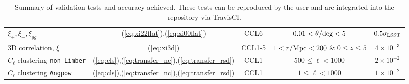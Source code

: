 \begin{sidewaystable*}[!htp]
\begin{tabular}{ l|c c c c}
    $\xi_+,\xi_-,\xi_{gg}$ & (\ref{eq:xi22flat}),(\ref{eq:xi00flat}) & CCL6 & $0.01< \theta/{\rm deg}< 5$&  $0.5\sigma_{\rm LSST}$\\
    3D correlation, $\xi$ & (\ref{eq:xi3d}) & CCL1-5 & $1<r/{\rm Mpc}<200$ \& $0 \leq z \leq 5$& $4\times 10^{-3}$  \\
    $C_\ell$ clustering {\tt non-Limber} &  (\ref{eq:cls}),(\ref{eq:transfer_nc}),(\ref{eq:transfer_rsd}) & CCL1 & $500 \leq \ell < 1000$ & $2\times 10^{-2}$ \\
    $C_\ell$ clustering {\tt Angpow} & (\ref{eq:cls}),(\ref{eq:transfer_nc}),(\ref{eq:transfer_rsd}) & CCL1 & $1 \leq \ell < 1000$ & $1\times 10^{-2}$  \\
    \hline
  \end{tabular}
  \caption{Summary of \ccl validation tests and accuracy achieved. These tests can be reproduced by the user and are integrated into the \ccl repository via TravisCI.}
  \label{tab:tests}
\end{sidewaystable*}
